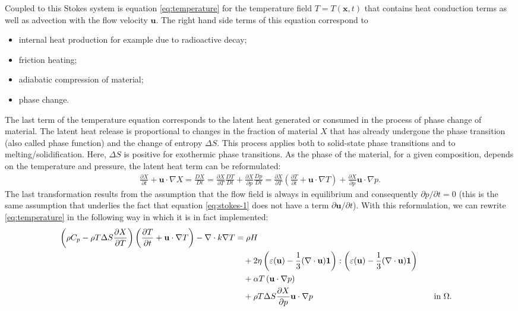 \documentclass{article}
\begin{document}
Coupled to this Stokes system is equation \eqref{eq:temperature} for the
temperature field $T=T(\mathbf x,t)$ that contains heat conduction terms as
well as advection with the flow velocity $\mathbf u$. The right hand side
terms of this equation correspond to
\begin{itemize}
\item internal heat production for example due to radioactive
  decay;
\item friction heating;
\item adiabatic compression of material;
\item phase change.
\end{itemize}
The last term of the temperature equation corresponds to
the latent heat generated or consumed in the process of phase change of material. The latent heat release
is proportional to changes in the fraction of material $X$ that has already
undergone the phase transition (also called phase function) and the change
of entropy $\Delta S$. This process applies both
to solid-state phase transitions and to melting/solidification.
Here, $\Delta S$ is positive for exothermic phase
transitions. As the phase of the material, for a given composition, depends
on the temperature and pressure, the latent heat term can be reformulated:
\begin{gather*}
\frac{\partial X}{\partial t} + \mathbf u\cdot\nabla X
=
\frac{DX}{Dt} 
= 
\frac{\partial X}{\partial T} \frac{DT}{Dt}
 + \frac{\partial X}{\partial p} \frac{Dp}{Dt}
= 
\frac{\partial X}{\partial T} 
\left(\frac{\partial T}{\partial t} + \mathbf u\cdot\nabla T
\right)
 + \frac{\partial X}{\partial p} \mathbf u\cdot\nabla p.
\end{gather*}
The last transformation results from the assumption that the flow field is
always in equilibrium and consequently $\partial p/\partial t=0$ (this is the
same assumption that underlies the fact that equation \eqref{eq:stokes-1}
does not have a term $\partial \mathbf u / \partial t$). With this
reformulation, we can rewrite \eqref{eq:temperature} in the following way in
which it is in fact implemented:
\begin{align}
  \label{eq:temperature-reformulated}
  \left(\rho C_p - \rho T \Delta S \frac{\partial X}{\partial T}\right) 
  \left(\frac{\partial T}{\partial t} + \mathbf u\cdot\nabla
  T\right) - \nabla\cdot k\nabla T
  &=
  \rho H
  \notag
  \\
  &\quad
  +
  2\eta
  \left(\varepsilon(\mathbf u) - \frac{1}{3}(\nabla \cdot \mathbf u)\mathbf 1\right)
  :
  \left(\varepsilon(\mathbf u) - \frac{1}{3}(\nabla \cdot \mathbf u)\mathbf 1\right)
  \\
  &\quad
  +\alpha T \left( \mathbf u \cdot \nabla p \right)
  \notag
  \\
  &\quad
  + \rho T \Delta S \frac{\partial X}{\partial p} \mathbf u\cdot\nabla p
  & \quad & \textrm{in $\Omega$}.
  \notag
\end{align}
\end{document}
